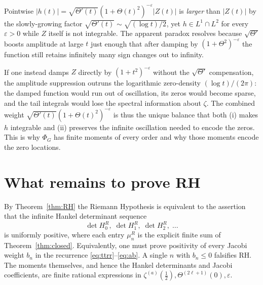 \documentclass[11pt]{amsart}
\theoremstyle{definition}
\begin{document}
Pointwise $|h(t)|=\sqrt{\Theta'(t)}(1+\Theta(t)^{2})^{-\varepsilon}|Z(t)|$
is {\em larger} than $|Z(t)|$ by the slowly-growing factor
$\sqrt{\Theta'(t)}\sim\sqrt{(\log t)/2}$, yet $h\in L^{1}\cap L^{2}$ for
every $\varepsilon>0$ while $Z$ itself is not integrable. The apparent
paradox resolves because $\sqrt{\Theta'}$ boosts amplitude at large $t$
just enough that after damping by $(1+\Theta^{2})^{-\varepsilon}$ the
function still retains infinitely many sign changes out to infinity.

If one instead damps $Z$ directly by $(1+t^{2})^{-\varepsilon}$ without the
$\sqrt{\Theta'}$ compensation, the amplitude suppression outruns the
logarithmic zero-density $(\log t)/(2\pi)$: the damped function would run
out of oscillation, its zeros would become sparse, and the tail integrals
would lose the spectral information about $\zeta$. The combined weight
$\sqrt{\Theta'(t)}(1+\Theta(t)^{2})^{-\varepsilon}$ is thus the unique
balance that both (i) makes $h$ integrable and (ii) preserves the infinite
oscillation needed to encode the zeros. This is why $\Phi_{G}$ has finite
moments of every order and why those moments encode the zero locations.

\section{What remains to prove RH}

By Theorem~\ref{thm:RH} the Riemann Hypothesis is equivalent to the
assertion that the infinite Hankel determinant sequence
\[
\det H_{0}^{R},\;\det H_{1}^{R},\;\det H_{2}^{R},\;\ldots
\]
is uniformly positive, where each entry $\mu_{n}^{R}$ is the explicit finite
sum of Theorem~\ref{thm:closed}. Equivalently, one must prove positivity of
every Jacobi weight $b_{n}$ in the recurrence
\eqref{eq:ttrr}--\eqref{eq:ab}. A single $n$ with $b_{n}\le 0$ falsifies RH.
The moments themselves, and hence the Hankel determinants and Jacobi
coefficients, are finite rational expressions in
$\zeta^{(a)}(\tfrac12),\Theta^{(2\ell+1)}(0),\varepsilon$.
\end{document}
